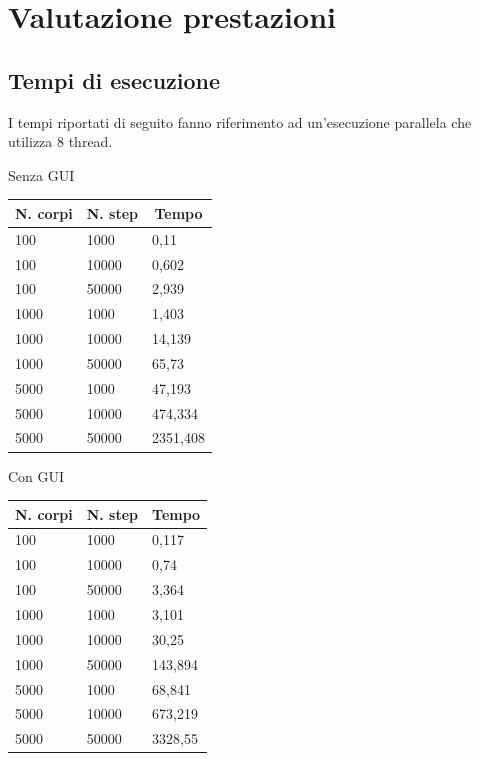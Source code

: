 \documentclass[12pt,a4paper,oneside]{article}
\begin{document}
	\section{Valutazione prestazioni}
	\subsection{Tempi di esecuzione}
	I tempi riportati di seguito fanno riferimento ad un'esecuzione parallela che utilizza 8 thread.
	
	\hfill
	\begin{minipage}{.4\textwidth}
		Senza GUI
		
		\begin{tabular}{|l|l|l|}
			\hline
			\multicolumn{1}{|c|}{\textbf{N. corpi}} & \multicolumn{1}{c|}{\textbf{N. step}} & \multicolumn{1}{c|}{\textbf{Tempo}} \\ \hline
			100 & 1000 & 0,11 \\ \hline
			100 & 10000 & 0,602 \\ \hline
			100 & 50000 & 2,939 \\ \hline
			1000 & 1000 & 1,403 \\ \hline
			1000 & 10000 & 14,139 \\ \hline
			1000 & 50000 & 65,73 \\ \hline
			5000 & 1000 & 47,193 \\ \hline
			5000 & 10000 & 474,334 \\ \hline
			5000 & 50000 & 2351,408 \\ \hline
		\end{tabular}
	\end{minipage}
	\hfill
	\begin{minipage}{.4\textwidth}
		Con GUI
		
		\begin{tabular}{|l|l|l|}
			\hline
			\multicolumn{1}{|c|}{\textbf{N. corpi}} & \multicolumn{1}{c|}{\textbf{N. step}} & \multicolumn{1}{c|}{\textbf{Tempo}} \\ \hline
			100 & 1000 & 0,117 \\ \hline
			100 & 10000 & 0,74 \\ \hline
			100 & 50000 & 3,364 \\ \hline
			1000 & 1000 & 3,101 \\ \hline
			1000 & 10000 & 30,25 \\ \hline
			1000 & 50000 & 143,894 \\ \hline
			5000 & 1000 & 68,841 \\ \hline
			5000 & 10000 & 673,219 \\ \hline
			5000 & 50000 & 3328,55 \\ \hline
		\end{tabular}
	\end{minipage}
	\hfill
\end{document}
